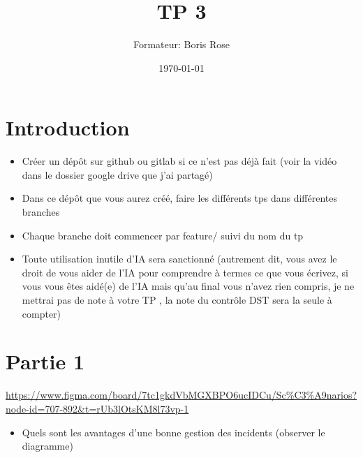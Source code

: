\documentclass[12pt, letterpaper]{article}
\title{TP 3}
\author{Formateur: Boris Rose}
\date{\today}
\begin{document}
\maketitle

\section*{Introduction}

\begin{tcolorbox}[colback=brown!5,colframe=brown!60!black,title=Consignes]

\begin{itemize}
    \item Créer un dépôt sur github ou gitlab si ce n'est pas déjà fait (voir la vidéo dans le dossier google drive que j'ai partagé)
    \item Dans ce dépôt que vous aurez créé, faire les différents tps dans différentes branches
    \item Chaque branche doit commencer par feature/ suivi du nom du tp 
    \item Toute utilisation inutile d'IA sera sanctionné (autrement dit, vous avez le droit de vous aider de l'IA pour comprendre à termes ce que vous écrivez, si vous vous êtes aidé(e) de l'IA mais qu'au final vous n'avez rien compris, je ne mettrai pas de note à votre TP , la note du contrôle DST sera la seule à compter)
\end{itemize}


\end{tcolorbox}


\section*{Partie 1}


\begin{tcolorbox}[colback=cyan!5,colframe=cyan!60!black,title=Figma du Cours]
    \url{https://www.figma.com/board/7tc1gkdVbMGXBPO6ucIDCu/Sc%C3%A9narios?node-id=707-892&t=rUb3lOtsKM8l73vp-1}
\end{tcolorbox}

\begin{itemize}
    \item Quels sont les avantages d'une bonne gestion des incidents (observer le diagramme)

\end{itemize}
\end{document}
